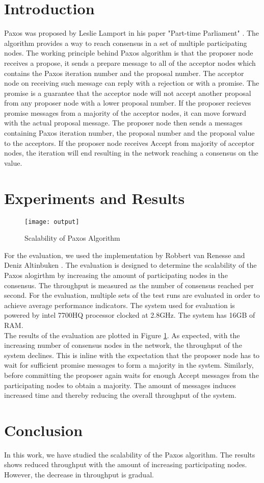 \section{Introduction}
Paxos was proposed by Leslie Lamport in his paper "Part-time Parliament" \cite{lamport1998part}. 
The algorithm provides a way to reach consensus in a set of multiple participating nodes. 
The working principle behind Paxos algorithm is that the proposer node receives a propose, it sends a prepare message to all of the acceptor nodes which contains the Paxos iteration number and the proposal number. 
The acceptor node on receiving such message can reply with a rejection or with a promise. 
The promise is a guarantee that the acceptor node will not accept another proposal from any proposer node with a lower proposal number. 
If the proposer recieves promise messages from a majority of the acceptor nodes, it can move forward with the actual proposal message. 
The proposer node then sends a messages containing Paxos iteration number, the proposal number and the proposal value to the acceptors. 
If the proposer node receives Accept from majority of acceptor nodes, the iteration will end resulting in the network reaching a consensus on the value. 
\section{Experiments and Results}
\begin{figure}
\centering
\vspace*{-3cm}
\texttt{[image: output]} 
\label{fig:paxos}
\vspace*{-3cm}
\caption{Scalability of Paxos Algorithm}
\end{figure}
For the evaluation, we used the implementation by Robbert van Renesse and Deniz Altinbuken \cite{van2015paxos}. 
The evaluation is designed to determine the scalability of the Paxos alogirthm by increasing the amount of participating nodes in the consensus. 
The throughput is measured as the number of consensus reached per second. 
For the evaluation, multiple sets of the test runs are evaluated in order to achieve average performance indicators. 
The system used for evaluation is powered by intel 7700HQ processor clocked at 2.8GHz. 
The system has 16GB of RAM. \\
The results of the evaluation are plotted in Figure \ref{fig:paxos}. 
As expected, with the increasing number of consensus nodes in the network, the throughput of the system declines. 
This is inline with the expectation that the proposer node has to wait for sufficient promise messages to form a majority in the system. 
Similarly, before committing the proposer again waits for enough Accept messages from the participating nodes to obtain a majority. 
The amount of messages induces increased time and thereby reducing the overall throughput of the system. 
\section{Conclusion}
In this work, we have studied the scalability of the Paxos algorithm. The results shows reduced throughput with the amount of increasing participating nodes. However, the decrease in throughput is gradual. 

